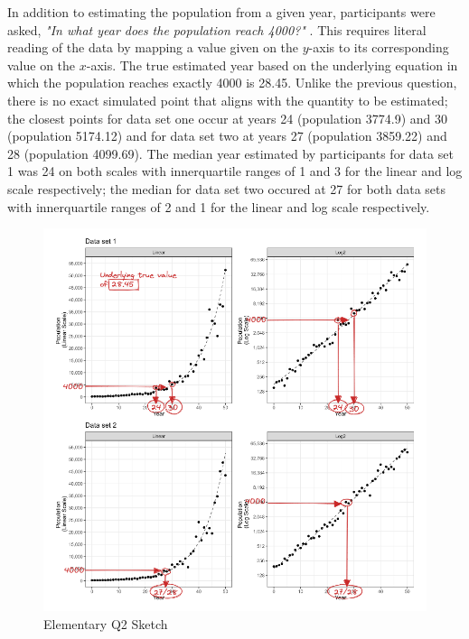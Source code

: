 \documentclass[print]{nuthesis}
\begin{document}
In addition to estimating the population from a given year, participants were asked, \textit{"In what year does the population reach 4000?"} .
This requires literal reading of the data by mapping a value given on the \(y\)-axis to its corresponding value on the \(x\)-axis.
The true estimated year based on the underlying equation in which the population reaches exactly 4000 is 28.45.
Unlike the previous question, there is no exact simulated point that aligns with the quantity to be estimated; the closest points for data set one occur at years 24 (population 3774.9) and 30 (population 5174.12) and for data set two at years 27 (population 3859.22) and 28 (population 4099.69).
The median year estimated by participants for data set 1 was 24 on both scales with innerquartile ranges of 1 and 3 for the linear and log scale respectively; the median for data set two occured at 27 for both data sets with innerquartile ranges of 2 and 1 for the linear and log scale respectively.

\begin{figure}[tbp]

{\centering \includegraphics[width=1\linewidth,]{images/03-estimation/qe2-sketch} 

}

\caption{Elementary Q2 Sketch}\label{fig:qe2-sketch}
\end{figure}
\end{document}
